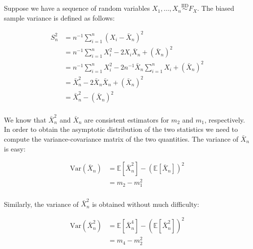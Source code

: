 \documentclass{report}
\begin{document}
Suppose we have a sequence of random variables $X_1, \dots, X_n \overset{\text{IID}}{\sim} F_X$. The biased sample variance is defined as follows:

\begin{equation}\label{eq:ex-lst-clt-proof-1}
    \begin{aligned}
        S^2_n 
          &= n^{-1} \sum_{i=1}^n \left(X_i - \bar{X}_n\right)^2 \\
          &= n^{-1} \sum_{i=1}^n X_i^2 - 2X_i\bar{X}_n + \left(\bar{X}_n\right)^2 \\
          &= n^{-1} \sum_{i=1}^n X_i^2 - 2n^{-1}\bar{X}_n \sum_{i=1}^n X_i + \left(\bar{X}_n\right)^2 \\
          &= \bar{X}^2_n - 2\bar{X}_n\bar{X}_n + \left(\bar{X}_n\right)^2 \\
          &= \bar{X}^2_n - \left(\bar{X}_n\right)^2 \\
    \end{aligned}
\end{equation}

We know that $\bar{X}^2_n$ and $\bar{X}_n$ are consistent estimators for $m_2$ and $m_1$, respectively. In order to obtain the asymptotic distribution of the two statistics we need to compute the variance-covariance matrix of the two quantities. The variance of $\bar{X}_n$ is easy:

\begin{equation}\label{eq:ex-lst-clt-proof-2}
\begin{aligned}
    \text{Var}\left(\bar{X}_n\right)
      &= \mathbb{E}\left[\bar{X}_n^2\right] - \left(\mathbb{E}\left[\bar{X}_n\right]\right)^2 \\
      &= m_2 - m_1^2 \\
\end{aligned}
\end{equation}

Similarly, the variance of $\bar{X}_n^2$ is obtained without much difficulty:

\begin{equation}\label{eq:ex-lst-clt-proof-3}
    \begin{aligned}
        \text{Var}\left(\bar{X}_n^2\right)
          &= \mathbb{E}\left[\bar{X}_n^4\right] - \left(\mathbb{E}\left[\bar{X}_n^2\right]\right)^2 \\
          &= m_4 - m_2^2 \\
    \end{aligned}
\end{equation}
\end{document}
